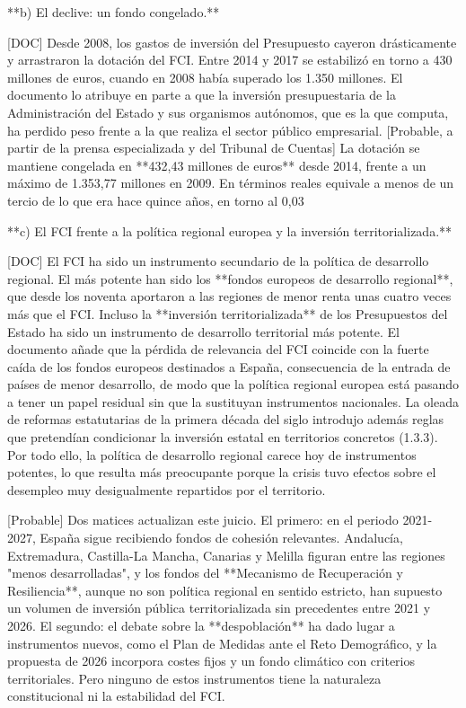 \documentclass[10pt,a4paper]{article}
\begin{document}
**b) El declive: un fondo congelado.**

[DOC] Desde 2008, los gastos de inversión del Presupuesto cayeron drásticamente y arrastraron la dotación del FCI. Entre 2014 y 2017 se estabilizó en torno a 430 millones de euros, cuando en 2008 había superado los 1.350 millones. El documento lo atribuye en parte a que la inversión presupuestaria de la Administración del Estado y sus organismos autónomos, que es la que computa, ha perdido peso frente a la que realiza el sector público empresarial. [Probable, a partir de la prensa especializada y del Tribunal de Cuentas] La dotación se mantiene congelada en **432,43 millones de euros** desde 2014, frente a un máximo de 1.353,77 millones en 2009. En términos reales equivale a menos de un tercio de lo que era hace quince años, en torno al 0,03%

**c) El FCI frente a la política regional europea y la inversión territorializada.**

[DOC] El FCI ha sido un instrumento secundario de la política de desarrollo regional. El más potente han sido los **fondos europeos de desarrollo regional**, que desde los noventa aportaron a las regiones de menor renta unas cuatro veces más que el FCI. Incluso la **inversión territorializada** de los Presupuestos del Estado ha sido un instrumento de desarrollo territorial más potente. El documento añade que la pérdida de relevancia del FCI coincide con la fuerte caída de los fondos europeos destinados a España, consecuencia de la entrada de países de menor desarrollo, de modo que la política regional europea está pasando a tener un papel residual sin que la sustituyan instrumentos nacionales. La oleada de reformas estatutarias de la primera década del siglo introdujo además reglas que pretendían condicionar la inversión estatal en territorios concretos (1.3.3). Por todo ello, la política de desarrollo regional carece hoy de instrumentos potentes, lo que resulta más preocupante porque la crisis tuvo efectos sobre el desempleo muy desigualmente repartidos por el territorio.

[Probable] Dos matices actualizan este juicio. El primero: en el periodo 2021-2027, España sigue recibiendo fondos de cohesión relevantes. Andalucía, Extremadura, Castilla-La Mancha, Canarias y Melilla figuran entre las regiones "menos desarrolladas", y los fondos del **Mecanismo de Recuperación y Resiliencia**, aunque no son política regional en sentido estricto, han supuesto un volumen de inversión pública territorializada sin precedentes entre 2021 y 2026. El segundo: el debate sobre la **despoblación** ha dado lugar a instrumentos nuevos, como el Plan de Medidas ante el Reto Demográfico, y la propuesta de 2026 incorpora costes fijos y un fondo climático con criterios territoriales. Pero ninguno de estos instrumentos tiene la naturaleza constitucional ni la estabilidad del FCI.
\end{document}
